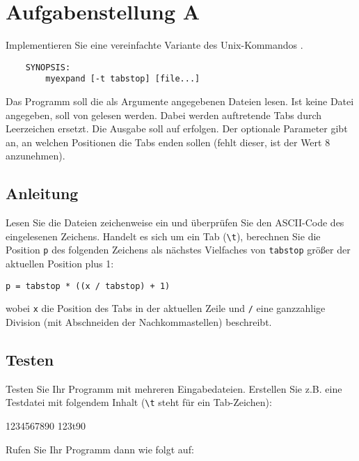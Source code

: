 




\section*{Aufgabenstellung A}
Implementieren Sie eine vereinfachte Variante des Unix-Kommandos
.
\begin{verbatim}
    SYNOPSIS:
        myexpand [-t tabstop] [file...]
\end{verbatim}

Das Programm  soll die als Argumente angegebenen Dateien
lesen. Ist keine Datei angegeben, soll von  gelesen werden.
Dabei werden auftretende Tabs durch Leerzeichen ersetzt. Die Ausgabe
soll auf  erfolgen. Der optionale Parameter 
gibt an, an welchen Positionen die Tabs enden sollen (fehlt dieser,
ist der Wert 8 anzunehmen).

\subsection*{Anleitung}
Lesen Sie die Dateien zeichenweise ein und überprüfen Sie den
ASCII-Code des eingelesenen Zeichens. Handelt es sich um ein Tab
(\verb|\t|), berechnen Sie die Position \verb|p| des folgenden
Zeichens als nächstes Vielfaches von \verb|tabstop| größer der
aktuellen Position plus 1:

\verb|p = tabstop * ((x / tabstop) + 1)|

wobei \verb|x| die Position des Tabs in der aktuellen Zeile und
\verb|/| eine ganzzahlige Division (mit Abschneiden der
Nachkommastellen) beschreibt.

\subsection*{Testen}
Testen Sie Ihr Programm mit mehreren Eingabedateien. Erstellen Sie
z.B. eine Testdatei  mit folgendem Inhalt (\verb|\t| steht für
ein Tab-Zeichen):

\begin{osuefmtcode}
	1234567890
	123\bslash{}t90
\end{osuefmtcode}

Rufen Sie Ihr Programm dann wie folgt auf:


\osueguidelinesone


